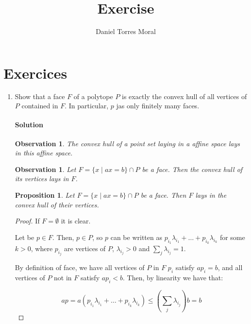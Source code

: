 \documentclass[a4paper,10pt]{article}
\title{Exercise}
\author{Daniel Torres Moral}
\newtheorem{prop}[theorem]{Proposition}
\newtheorem{obs}[theorem]{Observation}
\newcommand{\st}{ \; \left| \right. \;}
\begin{document}
  \maketitle
  
  \section{Exercices}
  
  \renewcommand{\theenumi}{(\arabic{enumi})}
  \begin{enumerate}
    \item Show that a face $F$ of a polytope $P$ is exactly the convex hull of all vertices of $P$ contained in $F$. In particular, $p$ jas only finitely many faces.
    
    \paragraph{Solution}
    
    \begin{obs}
      The convex hull of a point set laying in a affine space lays in this affine space.
    \end{obs}
    
    \begin{obs}
      Let  $F = \{ x \st a x = b \} \cap P$ be a face. Then the convex hull of its vertices lays in $F$.
    \end{obs}

    \begin{prop}
      Let $F = \{ x \st a x = b \} \cap P$ be a face. Then $F$ lays in the convex hull of their vertices.
    \end{prop}
    
    \begin{proof}
      If $F = \emptyset$ it is clear.
      
      Let be $p \in F$. Then, $p\in P$, so $p$ can be written as $ p_{i_1}\lambda_{i_1} + \dots + p_{i_k} \lambda_{i_k}$ for some $k>0$, where $p_{i_j}$ are vertices of $P$, $\lambda_{i_j} > 0$ and $\sum_j \lambda_{i_j} = 1$.
      
      By definition of face, we have all vertices of $P$ in $F$ $p_i$ satisfy $a p_i = b$, and all vertices of $P$ not in $F$ satisfy $a p_i < b$. Then, by linearity we have that:
      
      \begin{displaymath}
        a p = a ( p_{i_1}\lambda_{i_1} + \dots + p_{i_k} \lambda_{i_k} ) \leq ( \sum_j \lambda_{i_j}) b = b 
      \end{displaymath}


\end{proof}
\end{enumerate}
\end{document}
